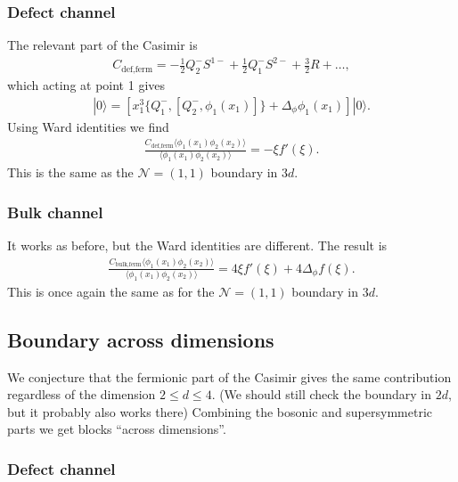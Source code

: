 \documentclass[letterpaper]{article}
\let\Oldsubsection\subsection
\renewcommand{\subsection}{\FloatBarrier\Oldsubsection}
\let\Oldsubsubsection\subsubsection
\renewcommand{\subsubsection}{\FloatBarrier\Oldsubsubsection}
\def\Nm{{\mathcal{N}}}
\begin{document}
\subsubsection{Defect channel}

The relevant part of the Casimir is
\begin{align}
 C_{\text{def,ferm}} = - \frac12 Q_2^- S^{1-} + \frac12 Q_1^- S^{2-} + \frac32 R + \ldots,
\end{align}
which acting at point 1 gives
\begin{align}
 [C_{\text{def,ferm}}, \phi_1(x_1)] |0 \rangle
 = \left[ x_1^3 \{ Q_1^-, [Q_2^-, \phi_1(x_1)] \} + \Delta_\phi \phi_1(x_1)
 \right] | 0 \rangle.
\end{align}
Using Ward identities we find
\begin{align}
 \frac{C_{\text{def,ferm}} \langle \phi_1(x_1) \phi_2(x_2) \rangle}
      {\langle \phi_1(x_1) \phi_2(x_2) \rangle}
 = - \xi  f'(\xi ).
\end{align}
This is the same as the $\Nm = (1, 1)$ boundary in $3d$.

\subsubsection{Bulk channel}

It works as before, but the Ward identities are different. The result is
\begin{align}
 \frac{C_{\text{bulk,ferm}} \langle \phi_1(x_1) \phi_2(x_2) \rangle}
      {\langle \phi_1(x_1) \phi_2(x_2) \rangle}
 = 4 \xi  f'(\xi )
 + 4 \Delta_\phi f(\xi ).
\end{align}
This is once again the same as for the $\Nm = (1, 1)$ boundary in $3d$.

\subsection{Boundary across dimensions}

We conjecture that the fermionic part of the Casimir gives the same contribution regardless of the dimension $2 \le d \le 4$. 
(We should still check the boundary in $2d$, but it probably also works there)
Combining the bosonic and supersymmetric parts we get blocks ``across dimensions''.

\subsubsection{Defect channel}
\end{document}
